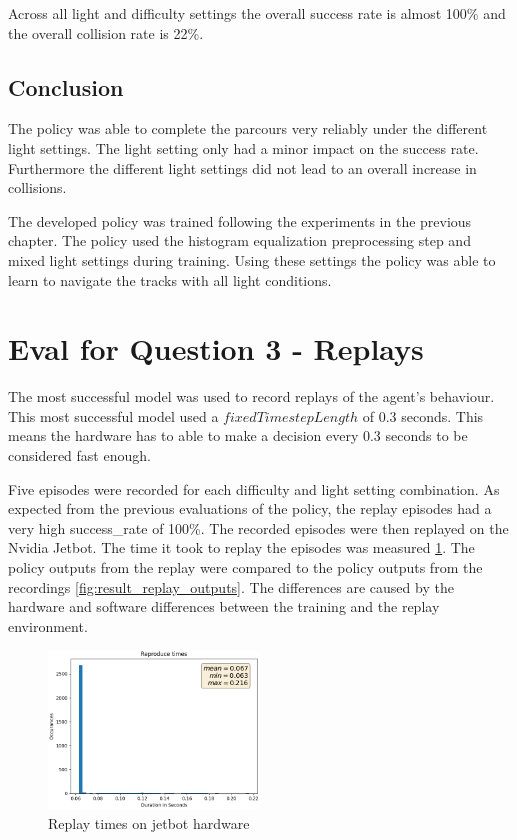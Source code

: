 Across all light and difficulty settings the overall success rate is almost 100\% and the overall collision rate is 22\%.

\subsection{Conclusion}

The policy was able to complete the parcours very reliably under the different light settings. The light setting only had a minor impact on the success rate.
Furthermore the different light settings did not lead to an overall increase in collisions.

The developed policy was trained following the experiments in the previous chapter. The policy used the histogram equalization preprocessing step and mixed light settings during training. Using these settings the policy was able to learn to navigate the tracks with all light conditions.


\section{Eval for Question 3 - Replays}

The most successful model was used to record replays of the agent's behaviour. This most successful model used a $fixedTimestepLength$ of $0.3$ seconds. This means the hardware has to able to make a decision every $0.3$ seconds to be considered fast enough.

Five episodes were recorded for each difficulty and light setting combination. As expected from the previous evaluations of the policy, the replay episodes had a very high success\_rate of 100\%. The recorded episodes were then replayed on the Nvidia Jetbot. The time it took to replay the episodes was measured \ref{fig:result_replay_times}. The policy outputs from the replay were compared to the policy outputs from the recordings \ref{fig:result_replay_outputs}. The differences are caused by the hardware and software differences between the training and the replay environment.


\begin{figure}
    \centering
    \includegraphics[width=0.5\textwidth]{Bilder/notebook_images/replay_times.png}
    \caption{Replay times on jetbot hardware}
    \label{fig:result_replay_times}
\end{figure} %


